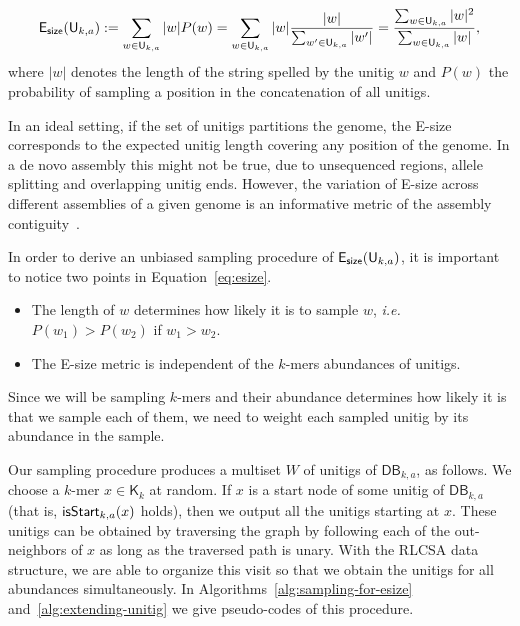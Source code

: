 \documentclass[a4paper,11pt]{article}
\newcommand{\kristoffer}[1]{{\color{red}{#1}}}
\newcommand{\alex}[1]{{\color{blue}{#1}}}
\newcommand{\DB}{\mathsf{DB}_{k,a}}
\newcommand{\U}{\mathsf{U}_{k,a}}
\newcommand{\K}{\mathsf{K}}
\newcommand{\esize}{{\sf E_{size}}}
\newcommand{\isstart}{{\sf isStart}_{k,a}}
\begin{document}
\begin{equation}
\label{eq:esize}
\esize(\U) := \sum_{w \in \U}|w|P(w) = \sum_{w \in \U} |w|\frac{|w|}{\sum_{w' \in \U}|w'|} = \frac{\sum_{w \in \U}|w|^2}{\sum_{w \in \U}|w|},	
\end{equation}
where $|w|$ denotes the length of the string spelled by the unitig $w$ and $P(w)$ the probability of sampling a position in the concatenation of all unitigs. 

In an ideal setting, if the set of unitigs partitions the genome, the E-size corresponds to the expected unitig length covering any position of the genome. In a de novo assembly this might not be true, due to unsequenced regions, allele splitting and overlapping unitig ends. However, the variation of E-size across different assemblies of a given genome is an informative metric of the assembly contiguity~\cite{Salzberg2011}. 

In order to derive an unbiased sampling procedure of $\esize(\U)$, it is important to notice two points in Equation~\ref{eq:esize}.
\begin{itemize}
	\item The length of $w$ determines how likely it is to sample $w$, \emph{i.e.} $P(w_1)>P(w_2)$ if $w_1>w_2$.
	\item The E-size metric is independent of the $k$-mers abundances of unitigs. 
\end{itemize}
Since we will be sampling $k$-mers and their abundance determines how likely it is that we sample each of them, we need to weight each sampled unitig by its abundance in the sample.


Our sampling procedure produces a multiset $W$ of unitigs of $\DB$, as follows. We choose a $k$-mer $x \in \K_k$ at random. If $x$ is a start node of some unitig of $\DB$ (that is, $\isstart(x)$ holds), then we output all the unitigs starting at $x$. These unitigs can be obtained by traversing the graph by following each of the out-neighbors of $x$ as long as the traversed path is unary. With the RLCSA data structure, we are able to organize this visit so that we obtain the unitigs for all abundances simultaneously. In Algorithms~\ref{alg:sampling-for-esize} and~\ref{alg:extending-unitig} we give pseudo-codes of this procedure. 
\end{document}
